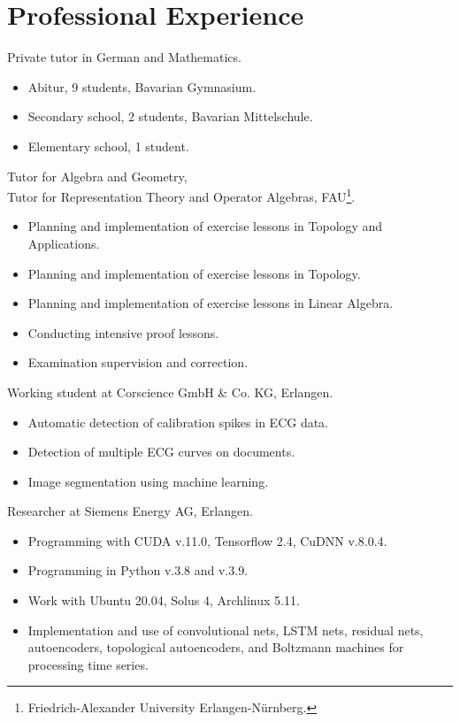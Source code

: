 \documentclass[a4paper, 12pt]{article}
\newcommand{\years}[1]{\marginnote{\scriptsize #1}}
\begin{document}
\section*{Professional Experience}
\years{2024--25} Private tutor in German and Mathematics.
\begin{itemize}
	\item Abitur, 9 students, Bavarian Gymnasium.
	\item Secondary school, 2 students, Bavarian Mittelschule.
	\item Elementary school, 1 student.
\end{itemize}
\years{2023--24} Tutor for Algebra and Geometry, \\ Tutor for Representation Theory and Operator Algebras, FAU\footnote{Friedrich-Alexander University Erlangen-Nürnberg.}.
\begin{itemize}
	\item Planning and implementation of exercise lessons in \glqq Topology and Applications\grqq.
	\item Planning and implementation of exercise lessons in \glqq Topology\grqq.
	\item Planning and implementation of exercise lessons in \glqq Linear Algebra\grqq.
	\item Conducting intensive proof lessons.
	\item Examination supervision and correction.
\end{itemize}
\years{2021--22} Working student at Corscience GmbH \& Co. KG, Erlangen.
\begin{itemize}
	\item Automatic detection of calibration spikes in ECG data.
	\item Detection of multiple ECG curves on documents.
	\item Image segmentation using machine learning.
\end{itemize}
\years{2019--21} Researcher at Siemens Energy AG, Erlangen.
\begin{itemize}
	\item Programming with CUDA v.11.0, Tensorflow 2.4, CuDNN v.8.0.4.
	\item Programming in Python v.3.8 and v.3.9.
	\item Work with Ubuntu 20.04, Solus 4, Archlinux 5.11.
	\item Implementation and use of convolutional nets, LSTM nets, residual nets, autoencoders, topological autoencoders, and Boltzmann machines for processing time series.
\end{itemize}
\end{document}
